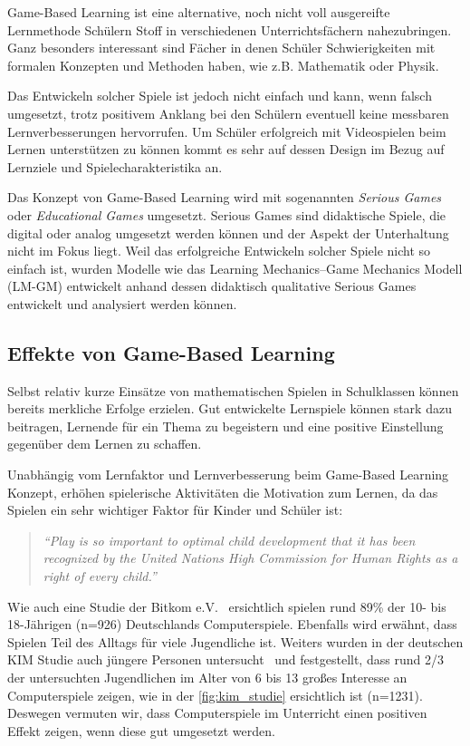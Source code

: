 \documentclass[11pt, a4paper]{article}
\begin{document}
Game-Based Learning ist eine alternative, noch nicht voll ausgereifte Lernmethode Schülern Stoff in verschiedenen Unterrichtsfächern nahezubringen. Ganz besonders interessant sind Fächer in denen Schüler Schwierigkeiten mit formalen Konzepten und Methoden haben, wie z.B. Mathematik oder Physik. 

Das Entwickeln solcher Spiele ist jedoch nicht einfach und kann, wenn falsch umgesetzt, trotz positivem Anklang bei den Schülern eventuell keine messbaren Lernverbesserungen hervorrufen. Um Schüler erfolgreich mit Videospielen beim Lernen unterstützen zu können kommt es sehr auf dessen Design im Bezug auf Lernziele und Spielecharakteristika an.~\cite{Kiili_Devlin_Perttula_Tuomi_Lindstedt_2015}

Das Konzept von Game-Based Learning wird mit sogenannten \textit{Serious Games} oder \textit{Educational Games} umgesetzt. Serious Games sind didaktische Spiele, die digital oder analog umgesetzt werden können und der Aspekt der Unterhaltung nicht im Fokus liegt. Weil das erfolgreiche Entwickeln solcher Spiele nicht so einfach ist, wurden Modelle wie das Learning Mechanics–Game Mechanics Modell (LM-GM) entwickelt anhand dessen didaktisch qualitative Serious Games entwickelt und analysiert werden können.~\cite{arnab2015mapping}

\subsection*{Effekte von Game-Based Learning}

Selbst relativ kurze Einsätze von mathematischen Spielen in Schulklassen können bereits merkliche Erfolge erzielen. Gut entwickelte Lernspiele können stark dazu beitragen, Lernende für ein Thema zu begeistern und eine positive Einstellung gegenüber dem Lernen zu schaffen.~\cite{killi_game_based_learning_coming_of_age_2015}

Unabhängig vom Lernfaktor und Lernverbesserung beim Game-Based Learning Konzept, erhöhen spielerische Aktivitäten die Motivation zum Lernen, da das Spielen ein sehr wichtiger Faktor für Kinder und Schüler ist:

\begin{quote}
    \textit{``Play is so important to optimal child development that it has been recognized by the United Nations High Commission for Human Rights as a right of every child.''}\hfill~\cite{ginsburg2007importance}
\end{quote}

Wie auch eine Studie der Bitkom e.V.~\cite{nietan_tropf_2017} ersichtlich spielen rund 89\% der 10- bis 18-Jährigen (n=926) Deutschlands Computerspiele. Ebenfalls wird erwähnt, dass Spielen Teil des Alltags für viele Jugendliche ist. Weiters wurden in der deutschen KIM Studie auch jüngere Personen untersucht~\cite{feierabend2018kim} und festgestellt, dass rund 2/3 der untersuchten Jugendlichen im Alter von 6 bis 13 großes Interesse an Computerspiele zeigen, wie in der \cref{fig:kim_studie} ersichtlich ist (n=1231). Deswegen vermuten wir, dass Computerspiele im Unterricht einen positiven Effekt zeigen, wenn diese gut umgesetzt werden.
\end{document}

